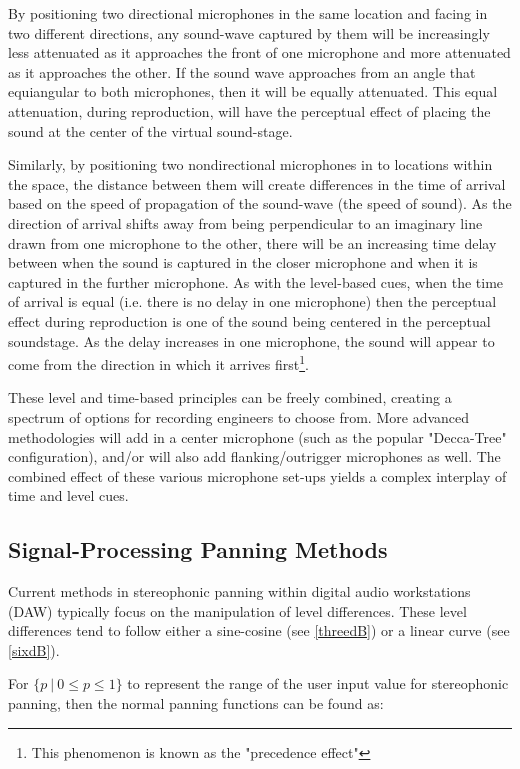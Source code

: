 By positioning two directional microphones in the same location and facing in two different directions, any sound-wave captured by them will be increasingly less attenuated as it approaches the front of one microphone and more attenuated as it approaches the other. If the sound wave approaches from an angle that equiangular to both microphones, then it will be equally attenuated. This equal attenuation, during reproduction, will have the perceptual effect of placing the sound at the center of the virtual sound-stage. 

Similarly, by positioning two nondirectional microphones in to locations within the space, the distance between them will create differences in the time of arrival based on the speed of propagation of the sound-wave (the speed of sound). As the direction of arrival shifts away from being perpendicular to an imaginary line drawn from one microphone to the other, there will be an increasing time delay between when the sound is captured in the closer microphone and when it is captured in the further microphone. As with the level-based cues, when the time of arrival is equal (i.e. there is no delay in one microphone) then the perceptual effect during reproduction is one of the sound being centered in the perceptual soundstage. As the delay increases in one microphone, the sound will appear to come from the direction in which it arrives first\footnote{This phenomenon is known as the "precedence effect"}.

These level and time-based principles can be freely combined, creating a spectrum of options for recording engineers to choose from. More advanced methodologies will add in a center microphone (such as the popular "Decca-Tree" configuration), and/or will also add flanking/outrigger microphones as well. The combined effect of these various microphone set-ups yields a complex interplay of time and level cues.

\subsection{Signal-Processing Panning Methods}

Current methods in stereophonic panning within digital audio workstations (DAW) typically focus on the manipulation of level differences. These level differences tend to follow either a sine-cosine (see \ref{threedB}) or a linear curve (see \ref{sixdB}).

For $\{p \: | \: 0 \leq p \leq 1\}$ to represent the range of the user input value for stereophonic panning, then the normal panning functions can be found as:

